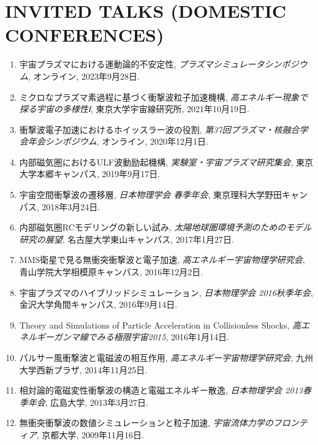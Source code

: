 \documentclass[lualatex,a4paper,ja=standard]{scrartcl}
\newcommand{\NewPart}[2]{\section*{\uppercase{#1} #2}}
\newcommand{\TalkEntry}[3]{
\item #1, \textit{#2}, #3.}
\begin{document}
\newpage
\NewPart{Invited Talks (Domestic Conferences)}{}
\begin{enumerate}

\TalkEntry
{宇宙プラズマにおける運動論的不安定性}
{プラズマシミュレータシンポジウム}
{オンライン, 2023年9月28日}

\TalkEntry
{ミクロなプラズマ素過程に基づく衝撃波粒子加速機構}
{高エネルギー現象で探る宇宙の多様性Ⅰ}
{東京大学宇宙線研究所, 2021年10月19日}

\TalkEntry
{衝撃波電子加速におけるホイッスラー波の役割}
{第37回プラズマ・核融合学会年会シンポジウム}
{オンライン, 2020年12月1日}

\TalkEntry
{内部磁気圏におけるULF波動励起機構}
{実験室・宇宙プラズマ研究集会}
{東京大学本郷キャンパス, 2019年9月17日}

\TalkEntry
{宇宙空間衝撃波の遷移層}
{日本物理学会 春季年会}
{東京理科大学野田キャンパス, 2018年3月24日}

\TalkEntry
{内部磁気圏RCモデリングの新しい試み}
{太陽地球圏環境予測のためのモデル研究の展望}
{名古屋大学東山キャンパス, 2017年1月27日}

\TalkEntry
{MMS衛星で見る無衝突衝撃波と電子加速}
{高エネルギー宇宙物理学研究会}
{青山学院大学相模原キャンパス, 2016年12月2日}

\TalkEntry
{宇宙プラズマのハイブリッドシミュレーション}
{日本物理学会 2016秋季年会}
{金沢大学角間キャンパス, 2016年9月14日}

\TalkEntry
{Theory and Simulations of Particle Acceleration in Collisionless Shocks}
{高エネルギーガンマ線でみる極限宇宙2015}
{2016年1月14日}

\TalkEntry
{パルサー風衝撃波と電磁波の相互作用}
{高エネルギー宇宙物理学研究会}
{九州大学西新プラザ, 2014年11月25日}

\TalkEntry
{相対論的電磁変性衝撃波の構造と電磁エネルギー散逸}
{日本物理学会 2013春季年会}
{広島大学, 2013年3月27日}

\TalkEntry
{無衝突衝撃波の数値シミュレーションと粒子加速}
{宇宙流体力学のフロンティア}
{京都大学, 2009年11月16日}


\end{enumerate}
\end{document}
